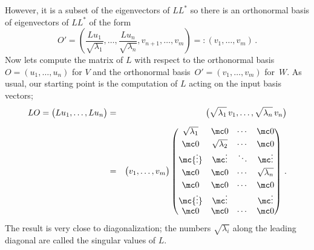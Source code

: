 However,  it is a subset of the eigenvectors of $LL^*$ so there is an orthonormal basis of eigenvectors of $LL^*$ of the form 
\[
O'=\left(\frac{Lu_1}{\sqrt{\lambda_1}},\ldots,\frac{Lu_n}{\sqrt{\lambda_n}},v_{n+1},\ldots,v_{m}\right)=:(v_1,\ldots,v_m)\, .
\]
Now lets compute the matrix of $L$ with respect to the orthonormal basis $O=(u_1,\ldots,u_n)$ for $V$ and the orthonormal basis~$O'=(v_1,\ldots,v_m)$ for~$W$. As usual, our starting point is the computation of $L$ acting on the input basis vectors;
\begin{eqnarray*}
LO=\big(Lu_1,\ldots, Lu_n\big)&=&
\big(\sqrt{\lambda_1}\,  v_1,\ldots,\sqrt{\lambda_n}\,  v_n\big)\\[2mm]&=&\big(v_1,\ldots,v_m\big)
\begin{pmatrix}
\sqrt{\lambda_1}&\mc0&\cdots&\mc0\\[1mm]
\mc0&\sqrt{\lambda_2}&\cdots&\mc0\\
\mc{\vdots}&\mc\vdots&\ddots&\mc\vdots\\[1mm]
\mc0&\mc0&\cdots&\sqrt{\lambda_n}\\[1mm]
\mc 0 & \mc 0& \cdots &\mc 0\\
\mc{\vdots}&\mc\vdots&&\mc\vdots\\
\mc 0 & \mc 0& \cdots &\mc 0
\end{pmatrix}\, .
\end{eqnarray*}
The result is very close to diagonalization; the numbers $\sqrt{\lambda_i}$ along the leading diagonal are called the singular values of $L$.

